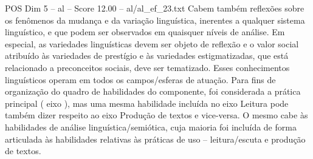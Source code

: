 \begin{textsample}{POS Dim 5 – al – Score 12.00 – al/al\_ef\_23.txt}
Cabem também reflexões sobre os fenômenos da mudança e da variação linguística, inerentes a qualquer sistema linguístico, e que podem ser observados em quaisquer níveis de análise.
Em especial, as variedades linguísticas devem ser objeto de reflexão e o valor social atribuído às variedades de prestígio e às variedades estigmatizadas, que está relacionado a preconceitos sociais, deve ser tematizado.
Esses conhecimentos linguísticos operam em todos os campos/esferas de atuação.
Para fins de organização do quadro de habilidades do componente, foi considerada a prática principal ( eixo ), mas uma mesma habilidade incluída no eixo Leitura pode também dizer respeito ao eixo Produção de textos e vice-versa.
O mesmo cabe às habilidades de análise linguística/semiótica, cuja maioria foi incluída de forma articulada às habilidades relativas às práticas de uso – leitura/escuta e produção de textos.

\end{textsample}
